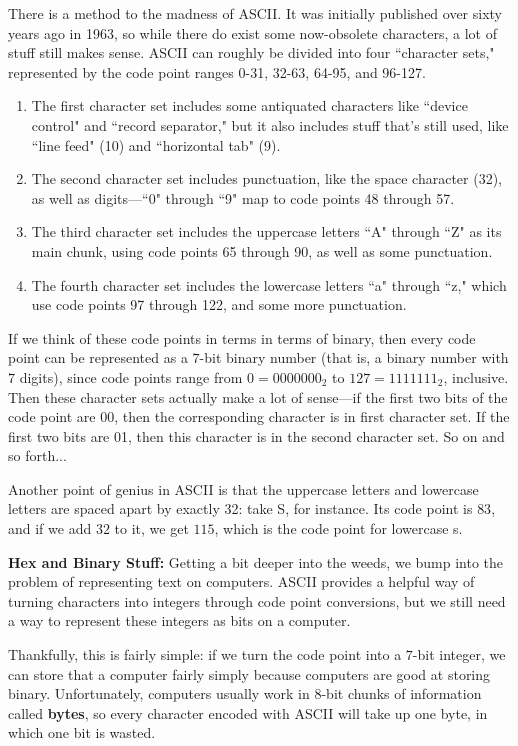 \documentclass{article}
\begin{document}
There is a method to the madness of ASCII. It was initially published over sixty years ago in 1963, so while there do exist some now-obsolete characters, a lot of stuff still makes sense. ASCII can roughly be divided into four ``character sets," represented by the code point ranges 0-31, 32-63, 64-95, and 96-127.
\begin{enumerate}
    \item The first character set includes some antiquated characters like ``device control" and ``record separator," but it also includes stuff that's still used, like ``line feed" (10) and ``horizontal tab" (9).
    \item The second character set includes punctuation, like the space character (32), as well as digits—``0" through ``9" map to code points 48 through 57.
    \item The third character set includes the uppercase letters ``A" through ``Z" as its main chunk, using code points 65 through 90, as well as some punctuation.
    \item The fourth character set includes the lowercase letters ``a" through ``z," which use code points 97 through 122, and some more punctuation.
\end{enumerate}

If we think of these code points in terms in terms of binary, then every code point can be represented as a $7$-bit binary number (that is, a binary number with $7$ digits), since code points range from $0=0000000_2$ to $127=1111111_2$, inclusive. Then these character sets actually make a lot of sense—if the first two bits of the code point are 00, then the corresponding character is in first character set. If the first two bits are 01, then this character is in the second character set. So on and so forth...

Another point of genius in ASCII is that the uppercase letters and lowercase letters are spaced apart by exactly 32: take S, for instance. Its code point is $83$, and if we add $32$ to it, we get $115$, which is the code point for lowercase s.

\textbf{Hex and Binary Stuff:}
Getting a bit deeper into the weeds, we bump into the problem of representing text on computers. ASCII provides a helpful way of turning characters into integers through code point conversions, but we still need a way to represent these integers as bits on a computer.

Thankfully, this is fairly simple: if we turn the code point into a $7$-bit integer, we can store that a computer fairly simply because computers are good at storing binary. Unfortunately, computers usually work in $8$-bit chunks of information called \textbf{bytes}, so every character encoded with ASCII will take up one byte, in which one bit is wasted.
\end{document}
